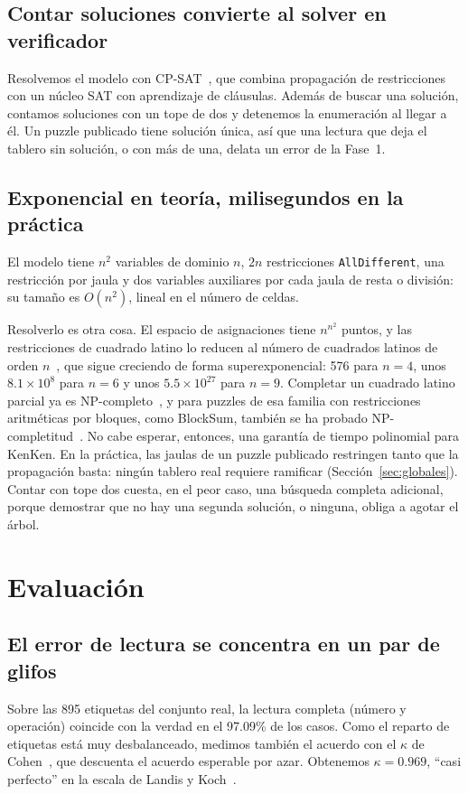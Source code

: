 \documentclass[conference]{IEEEtran}
\begin{document}
\subsection{Contar soluciones convierte al solver en verificador}
Resolvemos el modelo con CP-SAT~\cite{cpsat}, que combina propagación de restricciones con un núcleo SAT con aprendizaje de cláusulas. Además de buscar una solución, contamos soluciones con un tope de dos y detenemos la enumeración al llegar a él. Un puzzle publicado tiene solución única, así que una lectura que deja el tablero sin solución, o con más de una, delata un error de la Fase~1.

\subsection{Exponencial en teoría, milisegundos en la práctica}\label{sec:complejidad}
El modelo tiene $n^2$ variables de dominio $n$, $2n$ restricciones \texttt{AllDifferent}, una restricción por jaula y dos variables auxiliares por cada jaula de resta o división: su tamaño es $O(n^2)$, lineal en el número de celdas.

Resolverlo es otra cosa. El espacio de asignaciones tiene $n^{n^2}$ puntos, y las restricciones de cuadrado latino lo reducen al número de cuadrados latinos de orden $n$~\cite{oeislatin}, que sigue creciendo de forma superexponencial: 576 para $n = 4$, unos $8.1 \times 10^{8}$ para $n = 6$ y unos $5.5 \times 10^{27}$ para $n = 9$. Completar un cuadrado latino parcial ya es NP-completo~\cite{colbourn1984}, y para puzzles de esa familia con restricciones aritméticas por bloques, como BlockSum, también se ha probado NP-completitud~\cite{haraguchi2013}. No cabe esperar, entonces, una garantía de tiempo polinomial para KenKen. En la práctica, las jaulas de un puzzle publicado restringen tanto que la propagación basta: ningún tablero real requiere ramificar (Sección~\ref{sec:globales}). Contar con tope dos cuesta, en el peor caso, una búsqueda completa adicional, porque demostrar que no hay una segunda solución, o ninguna, obliga a agotar el árbol.

\section{Evaluación}\label{sec:eval}

\subsection{El error de lectura se concentra en un par de glifos}
Sobre las 895 etiquetas del conjunto real, la lectura completa (número y operación) coincide con la verdad en el 97.09\% de los casos. Como el reparto de etiquetas está muy desbalanceado, medimos también el acuerdo con el $\kappa$ de Cohen~\cite{cohen1960}, que descuenta el acuerdo esperable por azar. Obtenemos $\kappa = 0.969$, ``casi perfecto'' en la escala de Landis y Koch~\cite{landis1977}.
\end{document}
